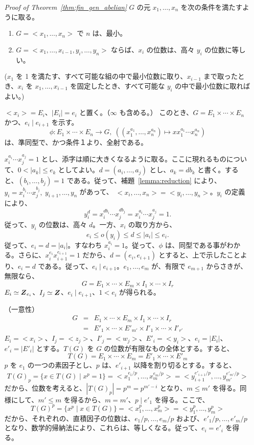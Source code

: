 \medskip
{\em Proof of Theorem~\ref{thm:fin_gen_abelian}\quad}
$G$ の元 $x_1,\ldots, x_n$ を次の条件を満たすように取る。
\begin{enumerate}
\item $G = <x_1,\ldots, x_n>$ で $n$ は、最小。
\item $G = <x_1,\ldots, x_{i-1},y_i,\ldots, y_n>$ ならば、$x_i$ の位数は、高々 $y_i$ の位数に等しい。
\end{enumerate}
($x_1$ を 1 を満たす、すべて可能な組の中で最小位数に取り、$x_{i-1}$ まで取ったとき、$x_i$ を $x_1,\ldots, x_{i-1}$ を固定したとき、すべて可能な $y_i$ の中で最小位数に取ればよい。)

$<x_i> = E_i$、$|E_i| = e_i$ と置く。（$\infty$ も含める。）
このとき、$G = E_1\times \cdots \times E_n$ かつ、$e_i\mid e_{i+1}$ を示す。
$$\phi : E_1 \times \cdots \times E_n \to G,\;((x_1^{a_1},\ldots,x_n^{a_n})\mapsto xx_1^{a_1}\cdots x_n^{a_n})$$
は、準同型で、かつ条件１より、全射である。

$x_i^{a_i}\cdots x_j^{a_j} = 1$ とし、添字は順に大きくなるように取る。ここに現れるものについて、$0 < |a_k| \leq e_k$ としてよい。$d = (a_i,\ldots, a_j)$ とし、$a_k = db_k$ と書く。すると、$(b_i,\ldots, b_j) = 1$ である。従って、補題~\ref{lemma:reduction} により、
$y_i = x_i^{b_i}\cdots x_j^{b_j}, \;y_{i+1},\ldots, y_n$ があって、
$<x_i,\ldots,x_n> = <y_i,\ldots, y_n>$。$y_i$ の定義により、
$$y_i^d = x_i^{db_i}\cdots x_j^{db_j} = x_i^{a_i}\cdots x_j^{a_j} = 1.$$
従って、$y_i$ の位数は、高々 $d$。一方、$x_i$ の取り方から、
$$e_i\leq o(y_i) \leq d \leq |a_i| \leq e_i.$$
従って、$e_i = d = |a_i|$。すなわち $x_i^{a_i} = 1$。従って、$\phi$ は、同型である事がわかる。さらに、$x_i^{e_i}x_{i+1}^{e_{i+1}} = 1$ だから、$d = (e_i,e_{i+1})$ とすると、上で示したことより、$e_i = d$ である。従って、$e_i\mid e_{i+1}$。$e_1,\ldots, e_m$ が、有限で $e_{m+1}$ からさきが、無限なら、
$$G = E_1 \times \cdots \times E_m \times I_1 \times \cdots \times I_r$$
$E_i \simeq \mbox{\boldmath $Z$}_{e_i}$、$I_j \simeq \mbox{\boldmath $Z$}$、$e_i\mid e_{i+1}$、$1 < e_i$ が得られる。

\smallskip
（一意性）\quad
\begin{eqnarray*}
G & = & E_1 \times \cdots \times E_m\times I_1 \times \cdots \times I_r\\
& = & E'_1 \times \cdots \times E'_{m'} \times I'_1 \times \cdots \times I'_{r'}
\end{eqnarray*}
$E_i = <x_i>$、$I_j = <z_j>$、$I'_j = <w_j>$、$E'_i = <y_i>$、$e_i = |E_i|$、$e'_i = |E'_i|$ とする。$T(G)$ を $G$ の位数が有限なもの全体とする。すると、
$$T(G) = E_1 \times \cdots \times E_m = E'_1 \times \cdots \times E'_m$$
$p$ を $e_1$ の一つの素因子とし、$p$ は、$e'_{i+1}$ 以降を割り切るとする。すると、
$$T(G)_p = \{x\in T(G)\mid x^p = 1\} = <x_1^{e_1/p},\ldots, x_m^{e_m/p}> = <y_{i+1}^{e'_{i+1}/p},\ldots,y_{m'}^{e'_{m'}/p}>$$
だから、位数を考えると、$|T(G)_p| = p^m = p^{m'-i}$ となり、$m\leq m'$ を得る。同様にして、$m'\leq m$ を得るから、$m = m'$、$p\mid e'_1$ を得る。ここで、
$$T(G)^p = \{x^p\mid x\in T(G)\} = <x_1^{p},\ldots, x_m^{p}> = <y_{1}^{p},\ldots,y_{m}^{p}>$$
だから、それぞれの、直積因子の位数は、$e_1/p,\ldots, e_m/p$ および、$e'_1/p,\ldots, e'_m/p$ となり、数学的帰納法により、これらは、等しくなる。従って、$e_i = e'_i$ を得る。

